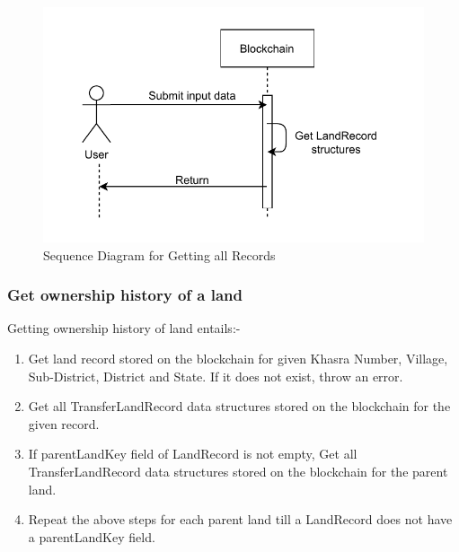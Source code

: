 \documentclass[12pt]{article}
\begin{document}
        \begin{figure}[H]
            \includegraphics[scale=0.25]{blockchain_seq_get_records}
            \centering
            \caption{Sequence Diagram for Getting all Records}
        \end{figure}


    \subsubsection{Get ownership history of a land}
        Getting ownership history of land entails:-
        \begin{enumerate}
            \item Get land record stored on the blockchain for given Khasra Number, Village, Sub-District, District and State. If it does not exist, throw an error.
            \item Get all TransferLandRecord data structures stored on the blockchain for the given record.
            \item If parentLandKey field of LandRecord is not empty, Get all TransferLandRecord data structures stored on the blockchain for the parent land.
            \item Repeat the above steps for each parent land till a LandRecord does not have a parentLandKey field. 
        \end{enumerate}
\end{document}
